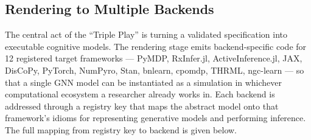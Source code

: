 \documentclass[
  english,
  9pt,
]{extarticle}
\begin{document}
\subsection{Rendering to Multiple
Backends}\label{rendering-to-multiple-backends}

The central act of the ``Triple Play'' is turning a validated
specification into executable cognitive models. The rendering stage
emits backend-specific code for 12 registered target frameworks ---
PyMDP, RxInfer.jl, ActiveInference.jl, JAX, DisCoPy, PyTorch, NumPyro,
Stan, bnlearn, cpomdp, THRML, ngc-learn --- so that a single GNN model
can be instantiated as a simulation in whichever computational ecosystem
a researcher already works in. Each backend is addressed through a
registry key that maps the abstract model onto that framework's idioms
for representing generative models and performing inference. The full
mapping from registry key to backend is given below.
\end{document}
